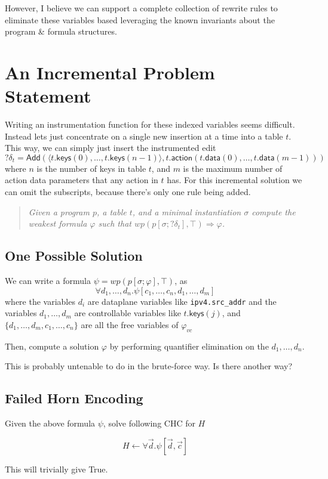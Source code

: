 \documentclass{article}
\newcommand{\MatchRow}{\mathsf{keys}}
\newcommand{\ActionRow}{\mathsf{action}}
\newcommand{\ActionDataRow}{\mathsf{data}}
\begin{document}
However, I believe we can support a complete collection of rewrite
rules to eliminate these variables based leveraging the known
invariants about the program \& formula structures.

\section{An Incremental Problem Statement}

Writing an instrumentation function for these indexed variables seems
difficult. Instead lets just concentrate on a single new insertion at
a time into a table $t$. This way, we can simply just insert the
instrumented edit
\[?\delta_t = \mathsf{Add}(\langle t.\MatchRow(0),\ldots,
  t.\MatchRow(n-1)\rangle, t.\ActionRow(t.\ActionDataRow(0), \ldots,
  t.\ActionDataRow(m-1)))\] where $n$ is the number of keys in table
$t$, and $m$ is the maximum number of action data parameters that any
action in $t$ has. For this incremental solution we can omit the
subscripts, because there's only one rule being added.

\begin{quote}
  \it Given a program $p$, a table $t$, and a minimal instantiation
  $\sigma$ compute the weakest formula $\varphi$ such that
  $\mathit{wp}(p[\sigma;?\delta_t],\top) \Rightarrow \varphi$.
\end{quote}

\subsection{One Possible Solution}

We can write a formula $\psi = \mathit{wp}(p[\sigma;\varphi],\top)$, as
\[\forall d_1,\ldots, d_n. \psi[c_1,\ldots,c_n,d_1,\ldots,d_m]\]
where the variables $d_i$ are dataplane variables like
\texttt{ipv4.src\_addr} and the variables $d_1, \ldots, d_m$ are
controllable variables like $t.\MatchRow(j)$, and
$\{d_1,\ldots, d_m, c_1,\ldots, c_n\}$ are all the free variables of $\varphi_{\mathit{vc}}$

Then, compute a solution $\varphi$ by performing quantifier
elimination on the $d_1,\ldots,d_n$.

This is probably untenable to do in the brute-force way. Is there another way?

\subsection{Failed Horn Encoding}


Given the above formula $\psi$, solve following CHC for $H$

\[H \leftarrow \forall \vec d.\psi[\vec d, \vec c]\]

This will trivially give True.
\end{document}
